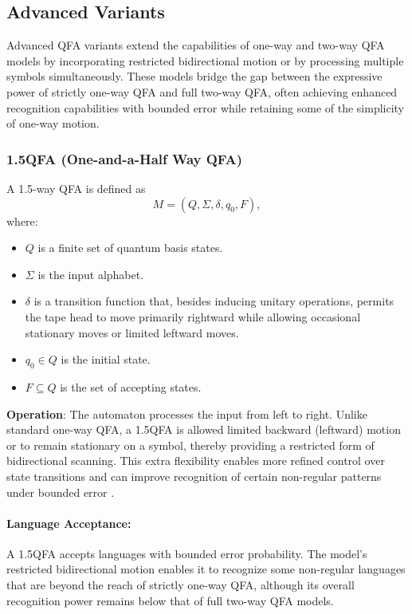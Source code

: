 \subsection{Advanced Variants}
\label{subsec:advanced-variants}

Advanced QFA variants extend the capabilities of one-way and two-way QFA models by incorporating restricted bidirectional motion or by processing multiple symbols simultaneously. These models bridge the gap between the expressive power of strictly one-way QFA and full two-way QFA, often achieving enhanced recognition capabilities with bounded error while retaining some of the simplicity of one-way motion.

\subsubsection{1.5QFA (One-and-a-Half Way QFA)}
\label{sssec:1.5qfa}
\begin{definition}[1.5QFA]
A 1.5-way QFA is defined as 
\[
M = (Q, \Sigma, \delta, q_0, F),
\]
where:
\begin{itemize}
    \item \( Q \) is a finite set of quantum basis states.
    \item \( \Sigma \) is the input alphabet.
    \item \( \delta \) is a transition function that, besides inducing unitary operations, permits the tape head to move primarily rightward while allowing occasional stationary moves or limited leftward moves.
    \item \( q_0 \in Q \) is the initial state.
    \item \( F \subseteq Q \) is the set of accepting states.
\end{itemize}
\end{definition}

\textbf{Operation}:  
The automaton processes the input from left to right. Unlike standard one-way QFA, a 1.5QFA is allowed limited backward (leftward) motion or to remain stationary on a symbol, thereby providing a restricted form of bidirectional scanning. This extra flexibility enables more refined control over state transitions and can improve recognition of certain non-regular patterns under bounded error \cite{kondacs1997power}.

\paragraph{Language Acceptance:}  
A 1.5QFA accepts languages with bounded error probability. The model’s restricted bidirectional motion enables it to recognize some non-regular languages that are beyond the reach of strictly one-way QFA, although its overall recognition power remains below that of full two-way QFA models.


